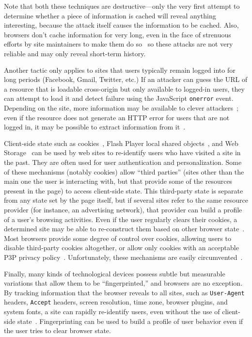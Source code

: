 \documentclass[conference]{IEEEtran}
\begin{document}
\noindent
Note that both these techniques are destructive---only the very first
attempt to determine whether a piece of information is cached will
reveal anything interesting, because the attack itself causes the
information to be cached.  Also, browsers don't cache information for
very long, even in the face of strenuous efforts by site maintainers
to make them do so~\cite{cachelife2007,cachelife2010} so these attacks
are not very reliable and may only reveal short-term history.

Another tactic only applies to sites that users typically remain
logged into for long periods (Facebook, Gmail, Twitter, etc.)  If an
attacker can guess the URL of a resource that is loadable cross-origin
but only available to logged-in users, they can attempt to load it and
detect failure using the JavaScript \verb|onerror| event.  Depending
on the site, more information may be available to clever
attackers~\cite{brewster08login}; even if the resource does not
generate an HTTP error for users that are not logged in, it may be
possible to extract information from it~\cite{thinkermade08focus}.

Client-side state such as cookies~\cite{httpstate_old,httpstate},
Flash Player local shared objects~\cite{lso}, and Web
Storage~\cite{webstorage} can be used by web sites to re-identify
users who have visited a site in the past.  They are often used for
user authentication and personalization.  Some of these mechanisms
(notably cookies) allow “third parties” (sites other than the main one
the user is interacting with, but that provide some of the resources
present in the page) to access client-side state.  This third-party
state is separate from any state set by the page itself, but if
several sites refer to the same resource provider (for instance, an
advertising network), that provider can build a profile of a user's
browsing activities.  Even if the user regularly clears their cookies,
a determined site may be able to re-construct them based on other
browser state~\cite{evercookie}.  Most browsers provide some degree of
control over cookies, allowing users to disable third-party cookies
altogether, or allow only cookies with an acceptable P3P privacy
policy~\cite{p3p}. Unfortunately, these mechanisms are easily
circumvented~\cite{jackson06thirdpartycookies,cranor-bad-p3p}.

Finally, many kinds of technological devices possess subtle but
measurable variations that allow them to be “fingerprinted,” and
browsers are no exception. By tracking information that the browser
reveals to all sites, such as \verb|User-Agent| headers, \verb|Accept|
headers, screen resolution, time zone, browser plugins, and system
fonts, a site can rapidly re-identify users, even without the use of
client-side state~\cite{pamphleteer,panopticlick}.  Fingerprinting can
be used to build a profile of user behavior even if the user tries to
clear browser state.
\end{document}
